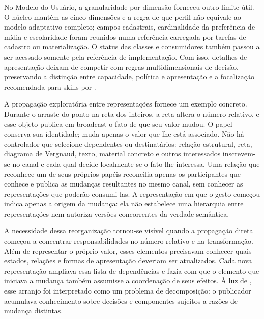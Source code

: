 \documentclass[preprint,12pt,authoryear]{elsarticle}
\begin{document}
No Modelo do Usuário, a granularidade por dimensão forneceu outro limite útil. O núcleo mantém as cinco dimensões e a regra de que perfil não equivale ao modelo adaptativo completo; campos cadastrais, cardinalidade da preferência de mídia e escolaridade foram reunidos numa referência carregada por tarefas de cadastro ou materialização. O status das classes e consumidores também passou a ser acessado somente pela referência de implementação. Com isso, detalhes de apresentação deixam de competir com regras multidimensionais de decisão, preservando a distinção entre capacidade, política e apresentação e a focalização recomendada para skills por \citet{hong2026smells}.

A propagação exploratória entre representações fornece um exemplo concreto. Durante o arraste do ponto na reta dos inteiros, a reta altera o número relativo, e esse objeto publica em broadcast o fato de que seu valor mudou. O papel conserva sua identidade; muda apenas o valor que lhe está associado. Não há controlador que selecione dependentes ou destinatários: relação estrutural, reta, diagrama de Vergnaud, texto, material concreto e outros interessados inscrevem-se no canal e cada qual decide localmente se o fato lhe interessa. Uma relação que reconhece um de seus próprios papéis reconcilia apenas os participantes que conhece e publica as mudanças resultantes no mesmo canal, sem conhecer as representações que poderão consumi-las. A representação em que o gesto começou indica apenas a origem da mudança: ela não estabelece uma hierarquia entre representações nem autoriza versões concorrentes da verdade semântica.

A necessidade dessa reorganização tornou-se visível quando a propagação direta começou a concentrar responsabilidades no número relativo e na transformação. Além de representar o próprio valor, esses elementos precisavam conhecer quais estados, relações e formas de apresentação deveriam ser atualizados. Cada nova representação ampliava essa lista de dependências e fazia com que o elemento que iniciava a mudança também assumisse a coordenação de seus efeitos. À luz de \citet{parnas1972criteria}, esse arranjo foi interpretado como um problema de decomposição: o publicador acumulava conhecimento sobre decisões e componentes sujeitos a razões de mudança distintas.
\end{document}
